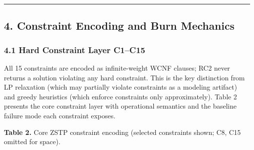 \documentclass[
  11pt,
]{article}
\begin{document}
\begin{center}\rule{0.5\linewidth}{0.5pt}\end{center}

\hypertarget{constraint-encoding-and-burn-mechanics}{%
\subsection{4. Constraint Encoding and Burn
Mechanics}\label{constraint-encoding-and-burn-mechanics}}

\hypertarget{hard-constraint-layer-c1c15}{%
\subsubsection{4.1 Hard Constraint Layer
C1--C15}\label{hard-constraint-layer-c1c15}}

All 15 constraints are encoded as infinite-weight WCNF clauses; RC2
never returns a solution violating any hard constraint. This is the key
distinction from LP relaxation (which may partially violate constraints
as a modeling artifact) and greedy heuristics (which enforce constraints
only approximately). Table 2 presents the core constraint layer with
operational semantics and the baseline failure mode each constraint
exposes.

\textbf{Table 2.} Core ZSTP constraint encoding (selected constraints
shown; C8, C15 omitted for space).
\end{document}
